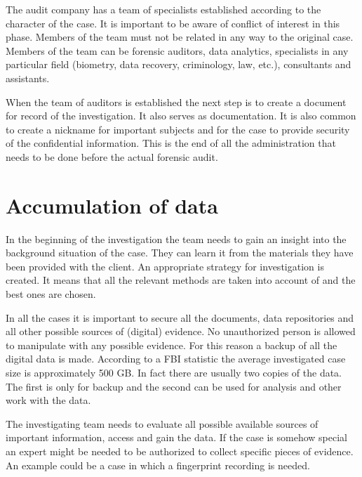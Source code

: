 The audit company has a team of specialists established according to the character of the case. It is important to be aware of conflict of interest in this phase. Members of the team must not be related in any way to the original case. Members of the team can be forensic auditors, data analytics, specialists in any particular field (biometry, data recovery, criminology, law, etc.), consultants and assistants. 

When the team of auditors is established the next step is to create a document for record of the investigation. It also serves as documentation. It is also common to create a nickname for important subjects and for the case to provide security of the confidential information. This is the end of all the administration that needs to be done before the actual forensic audit. %

\section{Accumulation of data}
In the beginning of the investigation the team needs to gain an insight into the background situation of the case. They can learn it from the materials they have been provided with the client. An appropriate strategy for investigation is created. It means that all the relevant methods are taken into account of and the best ones are chosen. 

In all the cases it is important to secure all the documents, data repositories and all other possible sources of (digital) evidence. No unauthorized person is allowed to manipulate with any possible evidence. For this reason a backup of all the digital data is made. According to a FBI statistic the average investigated case size is approximately 500 GB.  In fact there are usually two copies of the data. The first is only for backup and the second can be used for analysis and other work with the data. 

The investigating team needs to evaluate all possible available sources of important information, access and gain the data. If the case is somehow special an expert might be needed to be authorized to collect specific pieces of evidence. An example could be a case in which a fingerprint recording is needed. 


